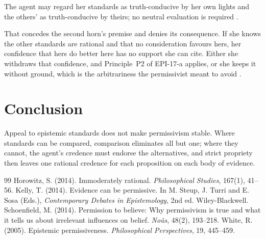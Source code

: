 \documentclass{situationist-preprint}
\begin{document}
\begin{objection}
The agent may regard her standards as truth-conducive by her own lights and the others' as truth-conducive by theirs; no neutral evaluation is required \citep{Schoenfield2014}.
\end{objection}

\begin{reply}
That concedes the second horn's premise and denies its consequence. If she knows the other standards are rational and that no consideration favours hers, her confidence that hers do better here has no support she can cite. Either she withdraws that confidence, and Principle~P2 of EPI-17-a applies, or she keeps it without ground, which is the arbitrariness the permissivist meant to avoid \citep{Horowitz2014}.
\end{reply}

\section{Conclusion}

Appeal to epistemic standards does not make permissivism stable. Where standards can be compared, comparison eliminates all but one; where they cannot, the agent's credence must endorse the alternatives, and strict propriety then leaves one rational credence for each proposition on each body of evidence.

\begin{thebibliography}{99}\small
{} Horowitz, S. (2014). Immoderately rational. \emph{Philosophical Studies}, 167(1), 41--56.
 Kelly, T. (2014). Evidence can be permissive. In M. Steup, J. Turri and E. Sosa (Eds.), \emph{Contemporary Debates in Epistemology}, 2nd ed. Wiley-Blackwell.
 Schoenfield, M. (2014). Permission to believe: Why permissivism is true and what it tells us about irrelevant influences on belief. \emph{No\^us}, 48(2), 193--218.
 White, R. (2005). Epistemic permissiveness. \emph{Philosophical Perspectives}, 19, 445--459.
\end{thebibliography}
\end{document}

